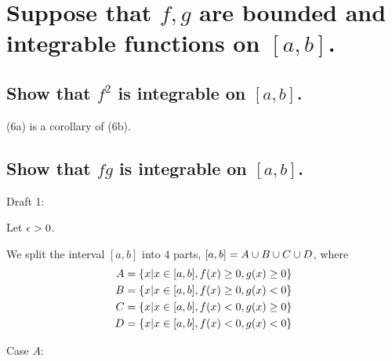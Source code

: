 \section{Suppose that $f,g$ are bounded and integrable functions on $[a,b]$.}
    \subsection{Show that $f^2$ is integrable on $[a,b]$.}
        (6a) is a corollary of (6b).

    \subsection{Show that $fg$ is integrable on $[a,b]$.}
        Draft 1:

        Let $\epsilon > 0$.

        We split the interval $[a,b]$ into $4$ parts, $[a,b]= A \cup B \cup C \cup D$, where
        \begin{align*}
            A&=\{ x | x \in [a,b], f(x) \geq 0, g(x) \geq 0 \}\\
            B&=\{ x | x \in [a,b], f(x) \geq 0, g(x) < 0 \}\\
            C&=\{ x | x \in [a,b], f(x) < 0, g(x) \geq 0 \}\\
            D&=\{ x | x \in [a,b], f(x) < 0, g(x) < 0 \}
        \end{align*}

        Case $A$:

